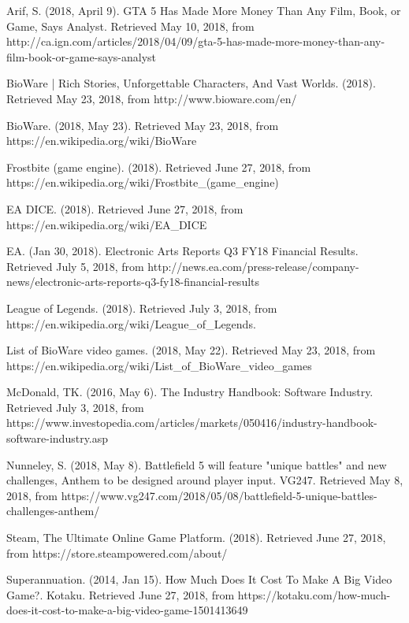 \documentclass[10pt,letterpaper]{article}
\begin{document}
\begin{thebibliography}{}
	
	Arif, S. (2018, April 9). GTA 5 Has Made More Money Than Any Film, Book, or Game, Says Analyst. Retrieved May 10, 2018, from http://ca.ign.com/articles/2018/04/09/gta-5-has-made-more-money-than-any-film-book-or-game-says-analyst

	BioWare | Rich Stories, Unforgettable Characters, And Vast Worlds. (2018). Retrieved May 23, 2018, from http://www.bioware.com/en/

	BioWare. (2018, May 23). Retrieved May 23, 2018, from https://en.wikipedia.org/wiki/BioWare

	Frostbite (game engine). (2018). Retrieved June 27, 2018, from https://en.wikipedia.org/wiki/Frostbite\_(game\_engine)

	EA DICE. (2018). Retrieved June 27, 2018, from https://en.wikipedia.org/wiki/EA\_DICE

	EA. (Jan 30, 2018). Electronic Arts Reports Q3 FY18 Financial Results. Retrieved July 5, 2018, from http://news.ea.com/press-release/company-news/electronic-arts-reports-q3-fy18-financial-results

	League of Legends. (2018). Retrieved July 3, 2018, from https://en.wikipedia.org/wiki/League\_of\_Legends.

	List of BioWare video games. (2018, May 22). Retrieved May 23, 2018, from https://en.wikipedia.org/wiki/List\_of\_BioWare\_video\_games

	McDonald, TK. (2016, May 6). The Industry Handbook: Software Industry. Retrieved July 3, 2018, from https://www.investopedia.com/articles/markets/050416/industry-handbook-software-industry.asp

	Nunneley, S. (2018, May 8). Battlefield 5 will feature "unique battles" and new challenges, Anthem to be designed around player input. VG247. Retrieved May 8, 2018, from https://www.vg247.com/2018/05/08/battlefield-5-unique-battles-challenges-anthem/

	Steam, The Ultimate Online Game Platform. (2018). Retrieved June 27, 2018, from https://store.steampowered.com/about/

	Superannuation. (2014, Jan 15). How Much Does It Cost To Make A Big Video Game?. Kotaku. Retrieved June 27, 2018, from https://kotaku.com/how-much-does-it-cost-to-make-a-big-video-game-1501413649


\end{thebibliography}
\end{document}
